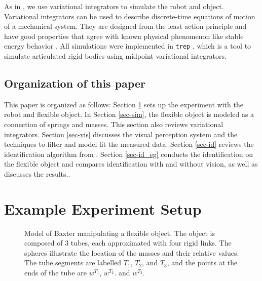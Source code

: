 \documentclass[runningheads,a4paper]{llncs}
\begin{document}
As in \cite{caldwell_coleman_correll_iros}, we use variational integrators to simulate the robot and object.  Variational integrators can be used to describe discrete-time equations of motion of a mechanical system.  They are designed from the least action principle and have good properties that agree with known physical phenomenon like stable energy behavior \cite{pekarek_murphey}. All simulations were implemented in \texttt{trep} \cite{johnson_murphey_scalable,johnson_murphey_linearization}, which is a tool to simulate articulated rigid bodies using midpoint variational integrators.


\subsection{Organization of this paper}
This paper is organized as follows: Section \ref{sec-exp} sets up the experiment with the robot and flexible object. In Section \ref{sec-sim}, the flexible object is modeled as a connection of springs and masses. This section also reviews variational integrators. Section \ref{sec-vis} discusses the visual perception system and the techniques to filter and model fit the measured data. Section \ref{sec-id} reviews the identification algorithm from \cite{caldwell_coleman_correll_iros}. Section \ref{sec-id_eg} conducts the identification on the flexible object and compares identification with and without vision, as well as discusses the results..%

\section{Example Experiment Setup}
\label{sec-exp}
\begin{figure}[!htb]
\centering
\def\svgwidth{.6\textwidth}%

\caption{Model of Baxter manipulating a flexible object. The object is composed of 3 tubes, each approximated with four rigid links. The spheres illustrate the location of the masses and their relative values. The tube segments are labelled $T_1$, $T_2$, and $T_3$, and the points at the ends of the tube are $w^{T_1}$, $w^{T_2}$. and $w^{T_3}$.}
\label{fig-baxter_y_sim}
\end{figure}
\end{document}
